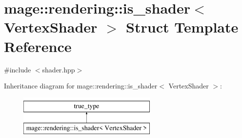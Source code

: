 \hypertarget{structmage_1_1rendering_1_1is__shader_3_01_vertex_shader_01_4}{}\section{mage\+:\+:rendering\+:\+:is\+\_\+shader$<$ Vertex\+Shader $>$ Struct Template Reference}
\label{structmage_1_1rendering_1_1is__shader_3_01_vertex_shader_01_4}


{\ttfamily \#include $<$shader.\+hpp$>$}

Inheritance diagram for mage\+:\+:rendering\+:\+:is\+\_\+shader$<$ Vertex\+Shader $>$\+:\begin{figure}[H]
\begin{center}
\leavevmode
\includegraphics[height=2.000000cm]{structmage_1_1rendering_1_1is__shader_3_01_vertex_shader_01_4}
\end{center}
\end{figure}
